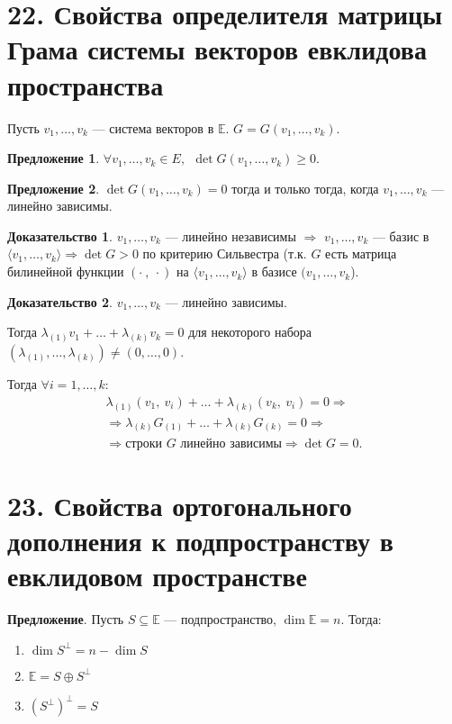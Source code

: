 \documentclass[a4paper, 12pt]{article}
\newcommand{\E}{\mathbb{E}}
\begin{document}
\section*{22. Свойства определителя матрицы Грама системы векторов евклидова пространства}
Пусть $v_1, \ldots, v_k$ --- система векторов в $\E$. $G = G(v_1, \ldots, v_k)$.

\textbf{Предложение 1}. $\forall v_1, \ldots, v_k \in E,\ \ \det G(v_1, \ldots, v_k) \geqslant 0$.

\textbf{Предложение 2}. $\det G(v_1, \ldots, v_k) = 0$ тогда и только тогда, когда $v_1, \ldots, v_k$ --- линейно зависимы.

\vspace{5mm}
\textbf{Доказательство 1}. $v_1, \ldots, v_k$ --- линейно независимы $\Longrightarrow$ $v_1, \ldots, v_k$ --- базис в $\langle v_1, \ldots, v_k \rangle \Longrightarrow \det G > 0$ по критерию Сильвестра (т.к. $G$ есть матрица билинейной функции $(\cdot\ ,\ \cdot)$ на $\langle v_1, \ldots, v_k \rangle$ в базисе $(v_1, \ldots, v_k$).

\textbf{Доказательство 2}. $v_1, \ldots, v_k$ --- линейно зависимы.

Тогда $\lambda_{(1)} v_1 + \ldots + \lambda_{(k)} v_k = 0$ для некоторого набора $(\lambda_{(1)}, \ldots, \lambda_{(k)}) \neq (0, \ldots, 0)$.

Тогда $\forall i = 1, \ldots, k$:
\vspace{-6mm}
\begin{gather*}
\lambda_{(1)} (v_1,\ v_i) + \ldots + \lambda_{(k)} (v_k,\ v_i) = 0 \Rightarrow \\
\Rightarrow \lambda_{(k)} G_{(1)} + \ldots + \lambda_{(k)} G_{(k)} = 0 \Rightarrow \\
\Rightarrow \text{строки $G$ линейно зависимы} \Rightarrow \det G = 0.
\end{gather*}

\section*{23. Свойства ортогонального дополнения к подпространству в евклидовом пространстве}
\textbf{Предложение}. Пусть $S \subseteq \E$ --- подпространство, $\dim\E = n$. Тогда:
\vspace{-3mm}
\begin{enumerate}
\itemsep=-0.3em
\item $\dim S^\bot = n - \dim S$
\item $\E= S \oplus S^\bot$
\item $(S^\bot)^\bot = S$
\end{enumerate}
\end{document}
